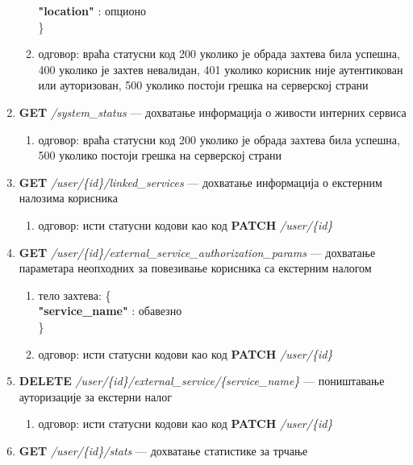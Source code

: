 \documentclass[12pt,oneside]{memoir}
\begin{document}
\begin{enumerate}
\begin{enumerate}
                    \hspace*{1cm} \textbf{"location"} : опционо\\
                \}
            \item одговор: враћа статусни код 200 уколико је обрада захтева била успешна, 400 уколико је захтев невалидан, 401 уколико корисник није аутентикован или ауторизован, 500 уколико постоји грешка на серверској страни
        \end{enumerate}
    \item \textbf{GET} \textit{/system\_status} --- дохватање информација о живости интерних сервиса
        \begin{enumerate}
            \item одговор: враћа статусни код 200 уколико је обрада захтева била успешна, 500 уколико постоји грешка на серверској страни
        \end{enumerate}
    \item \textbf{GET} \textit{/user/\{id\}/linked\_services} --- дохватање информација о екстерним налозима корисника
        \begin{enumerate}
            \item одговор: исти статусни кодови као код \textbf{PATCH} \textit{/user/\{id\}}
        \end{enumerate}
    \item \textbf{GET} \textit{/user/\{id\}/external\_service\_authorization\_params} --- дохватање параметара неопходних за повезивање корисника са екстерним налогом
        \begin{enumerate}
            \item тело захтева: \{\\
                    \hspace*{1cm} \textbf{"service\_name"} : обавезно\\
                \}
            \item одговор: исти статусни кодови као код \textbf{PATCH} \textit{/user/\{id\}}
        \end{enumerate}
    \item \textbf{DELETE} \textit{/user/\{id\}/external\_service/\{service\_name\}} --- поништавање ауторизације за екстерни налог
        \begin{enumerate}
            \item одговор: исти статусни кодови као код \textbf{PATCH} \textit{/user/\{id\}}
        \end{enumerate}
    \item \textbf{GET} \textit{/user/\{id\}/stats} --- дохватање статистике за трчање

\end{enumerate}
\end{document}
